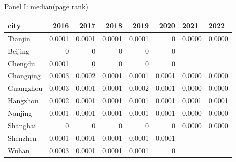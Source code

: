 \caption{Panel I: median(page rank)}
\begin{tabular}{lrrrrrll}
\hline
 city      &   2016 &   2017 &   2018 &   2019 &   2020 & 2021   & 2022   \\
\hline
 Tianjin   & 0.0001 & 0.0001 & 0.0001 & 0.0001 & 0      & 0.0000 & 0.0000 \\
 Beijing   & 0      & 0      & 0      & 0      & 0      &        &        \\
 Chengdu   & 0.0001 & 0      & 0      & 0      & 0      &        &        \\
 Chongqing & 0.0003 & 0.0002 & 0.0001 & 0.0001 & 0.0001 & 0.0000 & 0.0000 \\
 Guangzhou & 0.0003 & 0.0001 & 0.0001 & 0.0002 & 0.0001 & 0.0000 & 0.0000 \\
 Hangzhou  & 0.0002 & 0.0001 & 0.0001 & 0.0001 & 0.0001 & 0.0001 & 0.0001 \\
 Nanjing   & 0.0001 & 0.0001 & 0.0001 & 0.0001 & 0.0001 & 0.0000 & 0.0000 \\
 Shanghai  & 0      & 0      & 0      & 0      & 0      & 0.0000 & 0.0000 \\
 Shenzhen  & 0.0001 & 0.0001 & 0.0001 & 0.0001 & 0.0001 &        &        \\
 Wuhan     & 0.0003 & 0.0001 & 0.0001 & 0.0001 & 0      &        &        \\
\hline
\end{tabular}